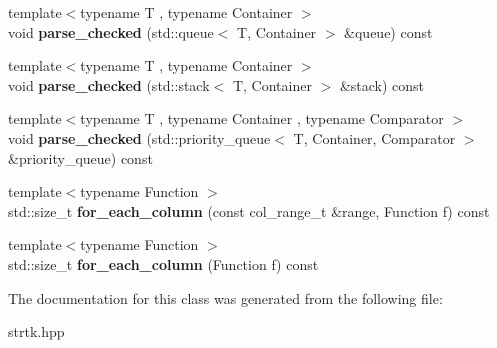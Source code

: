 \begin{DoxyCompactItemize}
\item 
\hypertarget{classstrtk_1_1token__grid_1_1row__type_a4e6801cefdcf07b591dd7011ee0e0c44}{{\footnotesize template$<$typename T , typename Container $>$ }\\void {\bfseries parse\-\_\-checked} (std\-::queue$<$ T, Container $>$ \&queue) const }\label{classstrtk_1_1token__grid_1_1row__type_a4e6801cefdcf07b591dd7011ee0e0c44}

\item 
\hypertarget{classstrtk_1_1token__grid_1_1row__type_a5061517ac08deb0839d523c1a35e8c20}{{\footnotesize template$<$typename T , typename Container $>$ }\\void {\bfseries parse\-\_\-checked} (std\-::stack$<$ T, Container $>$ \&stack) const }\label{classstrtk_1_1token__grid_1_1row__type_a5061517ac08deb0839d523c1a35e8c20}

\item 
\hypertarget{classstrtk_1_1token__grid_1_1row__type_acd37660bed797aa956febb8fea0045f7}{{\footnotesize template$<$typename T , typename Container , typename Comparator $>$ }\\void {\bfseries parse\-\_\-checked} (std\-::priority\-\_\-queue$<$ T, Container, Comparator $>$ \&priority\-\_\-queue) const }\label{classstrtk_1_1token__grid_1_1row__type_acd37660bed797aa956febb8fea0045f7}

\item 
\hypertarget{classstrtk_1_1token__grid_1_1row__type_a9203bc030b6f6df97041f8e5fe6dcf54}{{\footnotesize template$<$typename Function $>$ }\\std\-::size\-\_\-t {\bfseries for\-\_\-each\-\_\-column} (const col\-\_\-range\-\_\-t \&range, Function f) const }\label{classstrtk_1_1token__grid_1_1row__type_a9203bc030b6f6df97041f8e5fe6dcf54}

\item 
\hypertarget{classstrtk_1_1token__grid_1_1row__type_ade5fba9dd9c265536d048bd4dc17cf82}{{\footnotesize template$<$typename Function $>$ }\\std\-::size\-\_\-t {\bfseries for\-\_\-each\-\_\-column} (Function f) const }\label{classstrtk_1_1token__grid_1_1row__type_ade5fba9dd9c265536d048bd4dc17cf82}

\end{DoxyCompactItemize}


The documentation for this class was generated from the following file\-:\begin{DoxyCompactItemize}
\item 
strtk.\-hpp\end{DoxyCompactItemize}
